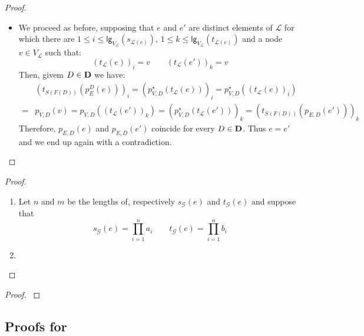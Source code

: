 \documentclass[3p]{elsarticle}
\newcommand{\lgh}{\mathsf{lg}}
\def\D{\textbf {\textup{D}}}
\theoremstyle{remark}
\theoremstyle{definition}
\begin{document}
\begin{proof}
\begin{itemize}
		\item  We proceed as before, supposing that $e$ and $e'$ are distinct elements of $\mathcal{L}$ for which there are $1\leq i \leq \lgh_{V_{\mathcal{L}}}(s_{\mathcal{L}(e)})$, $1\leq k \leq \lgh_{V_{\mathcal{L}}}(t_{\mathcal{L}(e)}) $ and a node $v\in V_{\mathcal{L}}$ such that:
				\[(t_{\mathcal{L}}(e))_i=v \qquad  (t_{\mathcal{L}}(e') )_k= v\]
		Then, givem $D\in \D$ we have:
		\begin{align*}&(t_{S(F(D))}( p^D_{E}(e)))_i = ( p^\star_{V,D}(t_{\mathcal{L}}(e)))_i=p^\star_{V, D}((t_{\mathcal{L}}(e))_i)\\=&p_{V,D}(v)=p_{V, D}((t_{\mathcal{L}}(e'))_k)=(p^\star_{V,D}(t_{\mathcal{L}}(e')))_k=(t_{S(F(D))}( p_{E,D}(e')))_k  	
		\end{align*}
		Therefore,  $p_{E,D}(e)$ and $p_{E,D}(e')$ coincide for every $D\in \D$. Thus  $e = e'$ and we end up again with a contradiction. \qedhere 
	\end{itemize}
\end{proof}

\count*
\begin{proof}\label{proof:count}
	\begin{enumerate}
		\item Let $n$ and $m$ be the lengths of, respectively $s_{\mathcal{G}}(e)$ and $t_{\mathcal{G}}(e)$ and suppose that
		\[s_{\mathcal{G}}(e)=\prod_{i=1}^{n}a_i \qquad t_{\mathcal{G}}(e)=\prod_{i=1}^{n}b_i\]
	
		
		\item \qedhere 
	\end{enumerate}
\end{proof}





\begin{proof}\label{proof:prod}
\end{proof}
\subsection{Proofs for }\label{app:due}
\fhyp*
\end{document}
